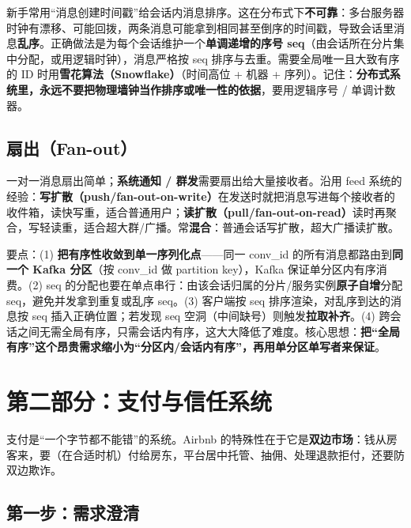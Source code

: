\begin{pitfall}
新手常用“消息创建时间戳”给会话内消息排序。这在分布式下\textbf{不可靠}：多台服务器时钟有漂移、可能回拨，两条消息可能拿到相同甚至倒序的时间戳，导致会话里消息\textbf{乱序}。正确做法是为每个会话维护一个\textbf{单调递增的序号 seq}（由会话所在分片集中分配，或用逻辑时钟），消息严格按 seq 排序与去重。需要全局唯一且大致有序的 ID 时用\textbf{雪花算法（Snowflake）}（时间高位 + 机器 + 序列）。记住：\textbf{分布式系统里，永远不要把物理墙钟当作排序或唯一性的依据}，要用逻辑序号 / 单调计数器。
\end{pitfall}

\subsection{扇出（Fan-out）}

一对一消息扇出简单；\textbf{系统通知 / 群发}需要扇出给大量接收者。沿用 feed 系统的经验：\textbf{写扩散（push/fan-out-on-write）}在发送时就把消息写进每个接收者的收件箱，读快写重，适合普通用户；\textbf{读扩散（pull/fan-out-on-read）}读时再聚合，写轻读重，适合超大群/广播。常\textbf{混合}：普通会话写扩散，超大广播读扩散。

\begin{followup}
要点：(1) \textbf{把有序性收敛到单一序列化点}——同一 conv\_id 的所有消息都路由到\textbf{同一个 Kafka 分区}（按 conv\_id 做 partition key），Kafka 保证单分区内有序消费。(2) seq 的分配也要在单点串行：由该会话归属的分片/服务实例\textbf{原子自增}分配 seq，避免并发拿到重复或乱序 seq。(3) 客户端按 seq 排序渲染，对乱序到达的消息按 seq 插入正确位置；若发现 seq 空洞（中间缺号）则触发\textbf{拉取补齐}。(4) 跨会话之间无需全局有序，只需会话内有序，这大大降低了难度。核心思想：\textbf{把“全局有序”这个昂贵需求缩小为“分区内/会话内有序”，再用单分区单写者来保证}。
\end{followup}

\section{第二部分：支付与信任系统}

支付是“一个字节都不能错”的系统。Airbnb 的特殊性在于它是\textbf{双边市场}：钱从房客来，要（在合适时机）付给房东，平台居中托管、抽佣、处理退款拒付，还要防双边欺诈。

\subsection{第一步：需求澄清}

